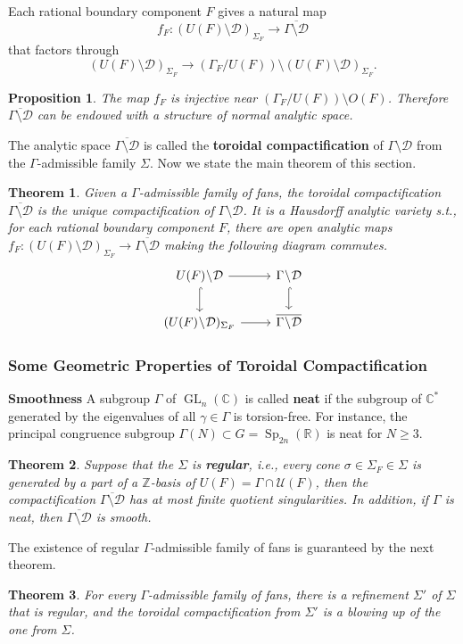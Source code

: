 \documentclass[11pt,english]{smfart}
\newtheorem{theorem}{Theorem}
\newtheorem{proposition}{Proposition}[section]
\theoremstyle{definition}
\theoremstyle{remark}
\newcommand{\R}{\mathbb{R}}
\renewcommand{\C}{\mathbb{C}}
\newcommand{\Z}{\mathbb{Z}}
\DeclareMathOperator{\GL}{GL}
\DeclareMathOperator{\Sp}{Sp}
\newcommand{\under}{\!\setminus\!}
\renewcommand{\bar}{\overline}
\begin{document}
Each rational boundary component $F$ gives a natural map \[f_F: (U(F)\under\mathcal{D})_{\Sigma_F}\to\bar{\Gamma\under\mathcal{D}}\]that factors through \[(U(F)\under\mathcal{D})_{\Sigma_F}\to(\Gamma_F/U(F))\under(U(F)\under\mathcal{D})_{\Sigma_F}.\]
\begin{proposition}
    The map $f_F$ is injective near $(\Gamma_F/U(F))\under O(F)$.
    Therefore $\bar{\Gamma\under\mathcal{D}}$ can be endowed with a structure of normal analytic space.
\end{proposition}
The analytic space $\bar{\Gamma\under\mathcal{D}}$ is called the \textbf{toroidal compactification} of $\Gamma\under\mathcal{D}$ from the $\Gamma$-admissible family $\Sigma$.
Now we state the main theorem of this section.
\begin{theorem}
    Given a $\Gamma$-admissible family of fans, the toroidal compactification $\bar{\Gamma\under\mathcal{D}}$ is the unique compactification of $\Gamma\under\mathcal{D}$.
    It is a Hausdorff analytic variety s.t., for each rational boundary component $F$, there are open analytic maps $f_F: (U(F)\under\mathcal{D})_{\Sigma_F}\to\bar{\Gamma\under\mathcal{D}}$ making the following diagram commutes.\[
        \begin{tikzcd}
            U(F)\under \mathcal{D} \arrow[r] \arrow[d, hook] & \Gamma\under\mathcal{D} \arrow[d, hook] \\
            (U(F)\under \mathcal{D})_{\Sigma_F} \arrow[r] & \bar{\Gamma\under\mathcal{D}}
        \end{tikzcd}\]
\end{theorem}

\subsubsection{Some Geometric Properties of Toroidal Compactification}
\noindent\textbf{Smoothness}
A subgroup $\Gamma$ of $\GL_n(\C)$ is called \textbf{neat} if the subgroup of $\C^*$ generated by the eigenvalues of all $\gamma\in\Gamma$ is torsion-free.
For instance, the principal congruence subgroup $\Gamma(N)\subset G = \Sp_{2n}(\R)$ is neat for $N\ge 3$. 
\begin{theorem}
    Suppose that the $\Sigma$ is \textbf{regular}, i.e., every cone $\sigma\in\Sigma_F\in \Sigma$ is generated by a part of a $\Z$-basis of $U(F) = \Gamma\cap\mathcal{U}(F)$,
    then the compactification $\bar{\Gamma\under\mathcal{D}}$ has at most finite quotient singularities.
    In addition, if $\Gamma$ is neat, then $\bar{\Gamma\under\mathcal{D}}$ is smooth.
\end{theorem}
The existence of regular $\Gamma$-admissible family of fans is guaranteed by the next theorem.
\begin{theorem}
    For every $\Gamma$-admissible family of fans, there is a refinement $\Sigma'$ of $\Sigma$ that is regular, and the toroidal compactification from $\Sigma'$ is a blowing up of the one from $\Sigma$.
\end{theorem}
\end{document}
